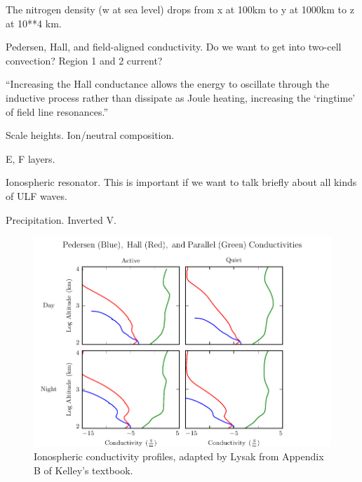 The nitrogen density (w at sea level) drops from x at 100km to y at 1000km to z at 10**4 km.


Pedersen, Hall, and field-aligned conductivity. Do we want to get into two-cell convection? Region 1 and 2 current? 


``Increasing the Hall conductance allows the energy to oscillate through the inductive process rather than dissipate as Joule heating, increasing the `ringtime' of field line resonances.''\cite{waters_2013}

Scale heights. Ion/neutral composition. 

E, F layers. 

Ionospheric \Alfven resonator. This is important if we want to talk briefly about all kinds of ULF waves. 

Precipitation. Inverted V. 


\begin{figure}[H]
    \centering
    \includegraphics[width=\textwidth]{figures/sigma.pdf}
    \caption[Ionospheric Conductivity Profiles]{
      Ionospheric conductivity profiles, adapted by Lysak\cite{lysak_2013} from Appendix B of Kelley's textbook\cite{kelley_1989}. 
    }
    \label{fig_sigma}
\end{figure}


